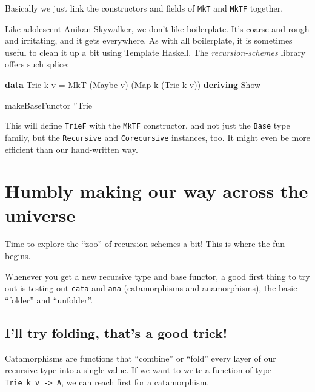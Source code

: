 \documentclass[]{article}
\newenvironment{Shaded}{}{}
\newcommand{\DataTypeTok}[1]{\textcolor[rgb]{0.56,0.13,0.00}{#1}}
\newcommand{\FunctionTok}[1]{\textcolor[rgb]{0.02,0.16,0.49}{#1}}
\newcommand{\KeywordTok}[1]{\textcolor[rgb]{0.00,0.44,0.13}{\textbf{#1}}}
\newcommand{\NormalTok}[1]{#1}
\begin{document}
Basically we just link the constructors and fields of \texttt{MkT} and
\texttt{MkTF} together.

Like adolescent Anikan Skywalker, we don't like boilerplate. It's coarse and
rough and irritating, and it gets everywhere. As with all boilerplate, it is
sometimes useful to clean it up a bit using Template Haskell. The
\emph{recursion-schemes} library offers such splice:

\begin{Shaded}
\begin{Highlighting}[]
\KeywordTok{data} \DataTypeTok{Trie}\NormalTok{ k v }\FunctionTok{=} \DataTypeTok{MkT}\NormalTok{ (}\DataTypeTok{Maybe}\NormalTok{ v) (}\DataTypeTok{Map}\NormalTok{ k (}\DataTypeTok{Trie}\NormalTok{ k v))}
  \KeywordTok{deriving} \DataTypeTok{Show}

\NormalTok{makeBaseFunctor ''}\DataTypeTok{Trie}
\end{Highlighting}
\end{Shaded}

This will define \texttt{TrieF} with the \texttt{MkTF} constructor, and not just
the \texttt{Base} type family, but the \texttt{Recursive} and
\texttt{Corecursive} instances, too. It might even be more efficient than our
hand-written way.

\hypertarget{humbly-making-our-way-across-the-universe}{%
\section{Humbly making our way across the
universe}\label{humbly-making-our-way-across-the-universe}}

Time to explore the ``zoo'' of recursion schemes a bit! This is where the fun
begins.

Whenever you get a new recursive type and base functor, a good first thing to
try out is testing out \texttt{cata} and \texttt{ana} (catamorphisms and
anamorphisms), the basic ``folder'' and ``unfolder''.

\hypertarget{ill-try-folding-thats-a-good-trick}{%
\subsection{I'll try folding, that's a good
trick!}\label{ill-try-folding-thats-a-good-trick}}

Catamorphisms are functions that ``combine'' or ``fold'' every layer of our
recursive type into a single value. If we want to write a function of type
\texttt{Trie\ k\ v\ -\textgreater{}\ A}, we can reach first for a catamorphism.
\end{document}

